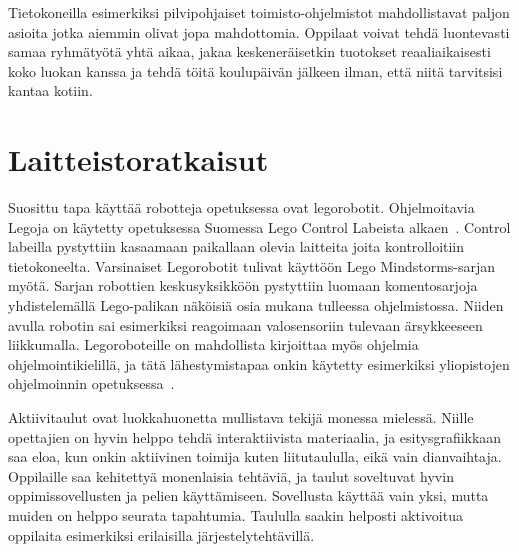 \documentclass[utf8,bachelor]{gradu3}
\begin{document}
Tietokoneilla esimerkiksi pilvipohjaiset toimisto-ohjelmistot mahdollistavat paljon asioita jotka aiemmin olivat jopa mahdottomia. Oppilaat voivat tehdä luontevasti samaa ryhmätyötä yhtä aikaa, jakaa keskeneräisetkin tuotokset reaaliaikaisesti koko luokan kanssa ja tehdä töitä  koulupäivän jälkeen ilman, että niitä tarvitsisi kantaa kotiin.

\section{Laitteistoratkaisut}
Suosittu tapa käyttää robotteja opetuksessa ovat legorobotit. Ohjelmoitavia Legoja on käytetty opetuksessa Suomessa  Lego Control Labeista alkaen~\parencite[][s. 22-23]{skrolliRobot}. Control labeilla pystyttiin kasaamaan paikallaan olevia laitteita joita kontrolloitiin tietokoneelta. Varsinaiset Legorobotit tulivat käyttöön Lego Mindstorms-sarjan myötä. Sarjan robottien keskusyksikköön pystyttiin luomaan komentosarjoja yhdistelemällä Lego-palikan näköisiä osia mukana tulleessa ohjelmistossa. Niiden avulla robotin sai esimerkiksi reagoimaan valosensoriin tulevaan ärsykkeeseen liikkumalla. Legoroboteille on mahdollista kirjoittaa myös ohjelmia ohjelmointikielillä, ja tätä lähestymistapaa onkin käytetty esimerkiksi yliopistojen ohjelmoinnin opetuksessa~\parencite[][]{korppirobo, hesarobo}.

Aktiivitaulut ovat luokkahuonetta mullistava tekijä monessa mielessä. Niille opettajien on hyvin helppo tehdä interaktiivista materiaalia, ja esitysgrafiikkaan saa eloa, kun onkin aktiivinen toimija kuten liitutaululla, eikä vain dianvaihtaja. Oppilaille saa kehitettyä monenlaisia tehtäviä, ja taulut soveltuvat hyvin oppimissovellusten ja pelien käyttämiseen. Sovellusta käyttää vain yksi, mutta muiden on helppo seurata tapahtumia. Taululla saakin helposti aktivoitua oppilaita esimerkiksi erilaisilla järjestelytehtävillä.
\end{document}
